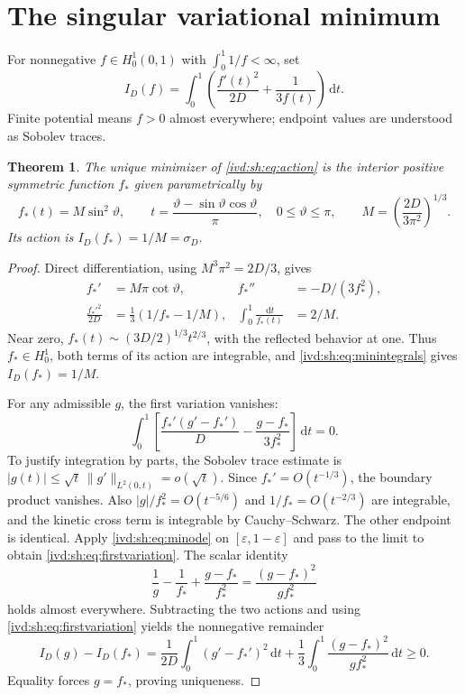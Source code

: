 \documentclass[11pt,letterpaper]{article}
\newtheorem{theorem}{Theorem}[section]
\theoremstyle{remark}\newtheorem{remark}[theorem]{Remark}
\numberwithin{equation}{section}
\newcommand{\dd}{\,\mathrm d}
\begin{document}
\section{The singular variational minimum}\label{ivd:sh:sec:variational}
For nonnegative $f\in H_0^1(0,1)$ with $\int_0^1 1/f<\infty$, set
\begin{equation}\label{ivd:sh:eq:action}
 I_D(f)=\int_0^1\left(\frac{f'(t)^2}{2D}+\frac1{3f(t)}\right)\dd t.
\end{equation}
Finite potential means $f>0$ almost everywhere; endpoint values are
understood as Sobolev traces.
\begin{theorem}\label{ivd:sh:thm:variational}
The unique minimizer of \eqref{ivd:sh:eq:action} is the interior positive
symmetric function $f_*$ given parametrically by
\begin{equation}\label{ivd:sh:eq:minimizer}
 f_*(t)=M\sin^2\vartheta,\qquad
 t=\frac{\vartheta-\sin\vartheta\cos\vartheta}{\pi},\quad
 0\le\vartheta\le\pi,\qquad M=\left(\frac{2D}{3\pi^2}\right)^{1/3}.
\end{equation}
Its action is $I_D(f_*)=1/M=\sigma_D$.
\end{theorem}
\begin{proof}
Direct differentiation, using $M^3\pi^2=2D/3$, gives
\begin{align}
 f_*'&=M\pi\cot\vartheta,&
 f_*''&=-D/(3f_*^2),\label{ivd:sh:eq:minode}\\
 \frac{f_*'^2}{2D}&=\frac13(1/f_*-1/M),&
 \int_0^1\frac{\dd t}{f_*(t)}&=2/M.
 \label{ivd:sh:eq:minintegrals}
\end{align}
Near zero, $f_*(t)\sim(3D/2)^{1/3}t^{2/3}$, with the reflected
behavior at one. Thus $f_*\in H_0^1$, both terms of its action
are integrable, and \eqref{ivd:sh:eq:minintegrals} gives $I_D(f_*)=1/M$.

For any admissible $g$, the first variation vanishes:
\begin{equation}\label{ivd:sh:eq:firstvariation}
 \int_0^1\left[\frac{f_*'(g'-f_*')}{D}
                   -\frac{g-f_*}{3f_*^2}\right]\dd t=0.
\end{equation}
To justify integration by parts, the Sobolev trace estimate is
$|g(t)|\le\sqrt t\,\|g'\|_{L^2(0,t)}=o(\sqrt t)$.
Since $f_*'=O(t^{-1/3})$, the boundary product vanishes.
Also $|g|/f_*^2=O(t^{-5/6})$ and $1/f_*=O(t^{-2/3})$
are integrable, and the kinetic cross term is integrable by
Cauchy--Schwarz. The other endpoint is identical. Apply
\eqref{ivd:sh:eq:minode} on $[\varepsilon,1-\varepsilon]$ and pass to the
limit to obtain \eqref{ivd:sh:eq:firstvariation}.
The scalar identity
\[
 \frac1g-\frac1{f_*}+\frac{g-f_*}{f_*^2}
   =\frac{(g-f_*)^2}{g f_*^2}
\]
holds almost everywhere. Subtracting the two actions and using
\eqref{ivd:sh:eq:firstvariation} yields the nonnegative remainder
\[
 I_D(g)-I_D(f_*)=
 \frac1{2D}\int_0^1(g'-f_*')^2\dd t
 +\frac13\int_0^1\frac{(g-f_*)^2}{g f_*^2}\dd t\ge0.
\]
Equality forces $g=f_*$, proving uniqueness.
\end{proof}
\end{document}
